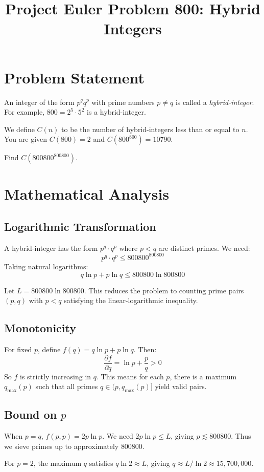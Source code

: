 \documentclass[12pt]{article}
\title{Project Euler Problem 800: Hybrid Integers}
\author{}
\date{}
\begin{document}
\maketitle

\section{Problem Statement}
An integer of the form $p^q q^p$ with prime numbers $p \neq q$ is called a \emph{hybrid-integer}. For example, $800 = 2^5 \cdot 5^2$ is a hybrid-integer.

We define $C(n)$ to be the number of hybrid-integers less than or equal to $n$. You are given $C(800) = 2$ and $C(800^{800}) = 10790$.

Find $C(800800^{800800})$.

\section{Mathematical Analysis}

\subsection{Logarithmic Transformation}
A hybrid-integer has the form $p^q \cdot q^p$ where $p < q$ are distinct primes. We need:
\[
p^q \cdot q^p \leq 800800^{800800}
\]
Taking natural logarithms:
\[
q \ln p + p \ln q \leq 800800 \ln 800800
\]

Let $L = 800800 \ln 800800$. This reduces the problem to counting prime pairs $(p, q)$ with $p < q$ satisfying the linear-logarithmic inequality.

\subsection{Monotonicity}
For fixed $p$, define $f(q) = q \ln p + p \ln q$. Then:
\[
\frac{\partial f}{\partial q} = \ln p + \frac{p}{q} > 0
\]
So $f$ is strictly increasing in $q$. This means for each $p$, there is a maximum $q_{\max}(p)$ such that all primes $q \in (p, q_{\max}(p)]$ yield valid pairs.

\subsection{Bound on $p$}
When $p = q$, $f(p, p) = 2p \ln p$. We need $2p \ln p \leq L$, giving $p \lesssim 800800$. Thus we sieve primes up to approximately $800800$.

For $p = 2$, the maximum $q$ satisfies $q \ln 2 \approx L$, giving $q \approx L / \ln 2 \approx 15{,}700{,}000$.
\end{document}
